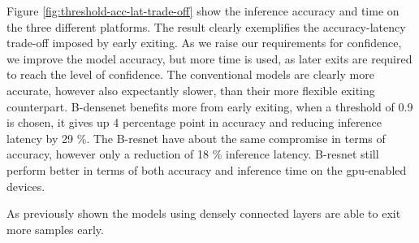 Figure \ref{fig:threshold-acc-lat-trade-off} show the inference accuracy and time on the three different platforms. The result clearly exemplifies the accuracy-latency trade-off imposed by early exiting. As we raise our requirements for confidence, we improve the model accuracy, but more time is used, as later exits are required to reach the level of confidence. The conventional models are clearly more accurate, however also expectantly slower, than their more flexible exiting counterpart. B-\gls{densenet} benefits more from early exiting, when a threshold of 0.9 is chosen, it gives up 4 percentage point in accuracy and reducing inference latency by 29 \%. The B-\gls{resnet} have about the same compromise in terms of accuracy, however only a reduction of 18 \% inference latency. B-\gls{resnet} still perform better in terms of both accuracy and inference time on the \gls{gpu}-enabled devices. 

As previously shown the models using densely connected layers are able to exit more samples early.

